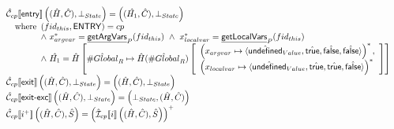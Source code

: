 \documentclass{article}
\makeatletter
\newcommand{\SF}[1]{\mbox{\textsf{#1}}}
\newcommand{\TT}[1]{\mbox{\texttt{#1}}}
\newcommand{\Entry}{\TT{entry}}
\newcommand{\Exit}{\TT{exit}}
\newcommand{\Exite}{\TT{exit-exc}~}
\newcommand{\comment}[1]{\textit{#1}}
\newcommand{\wherec}[1]{{\rm where}\begin{array}[t]{l}#1\end{array}}
\newcommand{\ifc}[1]{{\rm if}\begin{array}[t]{l}#1\end{array}}
\newcommand{\aN}{\hat{\mathcal{C}}}
\newcommand{\aI}{\hat{\mathcal{I}}}
\newcommand{\lbr}{\llbracket}
\newcommand{\rbr}{\rrbracket}
\newcommand{\hf}[1]{\underline{\sf #1}}
\newcommand{\varloc}[1]{\##1}
\newcommand{\varprop}[1]{@#1}
\newcommand{\avarloc}[1]{\hat{\##1}}
\newcommand{\atrue}{\hat{\SF{true}}}
\newcommand{\afalse}{\hat{\SF{false}}}
\newcommand{\aundef}{\hat{\SF{undefined}}}
\makeatother
\begin{document}
\[
\begin{array}{l} 
\aN _{cp}\lbr {\sf entry} \rbr \left((\hat{H},\hat{C}),\bot_{State}\right) =
 \left((\hat{H_1},\hat{C}), \bot_{State}\right)\\
 \quad\wherec{
   ({fid_{this}},\SF{ENTRY}) = cp \\
   \land\ x_{argvar}^{*} = \hf{getArgVars}_P({fid_{this}})\ 
   \land\ x_{localvar}^{*} = \hf{getLocalVars}_P({fid_{this}}) \\
   \land\ \hat{H_1}=
     \hat{H}\left[\avarloc{Global}_R\mapsto\hat{H}(\avarloc{Global}_R)
     \left[
       \begin{array}{l}
         \left(x_{argvar}\mapsto\langle\aundef_{Value},\atrue,\afalse,\afalse\rangle\right)^{*}, \\
         \left(x_{localvar}\mapsto\langle\aundef_{Value},\atrue,\atrue,\afalse\rangle\right)^{*} \\
    \end{array}
     \right]
     \right] \\
}\\

\aN_{cp}\lbr \SF{exit} \rbr \left((\hat{H},\hat{C}),\bot_{State}\right) = \left((\hat{H},\hat{C}),\bot_{State}\right) \\
\aN_{cp}\lbr \SF{exit-exc} \rbr \left((\hat{H},\hat{C}),\bot_{State}\right) = \left(\bot_{State},(\hat{H},\hat{C})\right) \\

\aN_{cp}\lbr i^+\rbr \left((\hat{H},\hat{C}),\hat{S}\right) =
  \left(\aI _{cp} \lbr i\rbr\left((\hat{H},\hat{C}),\hat{S}\right)\right)^{+} \\\\



\end{array}\]
\end{document}

